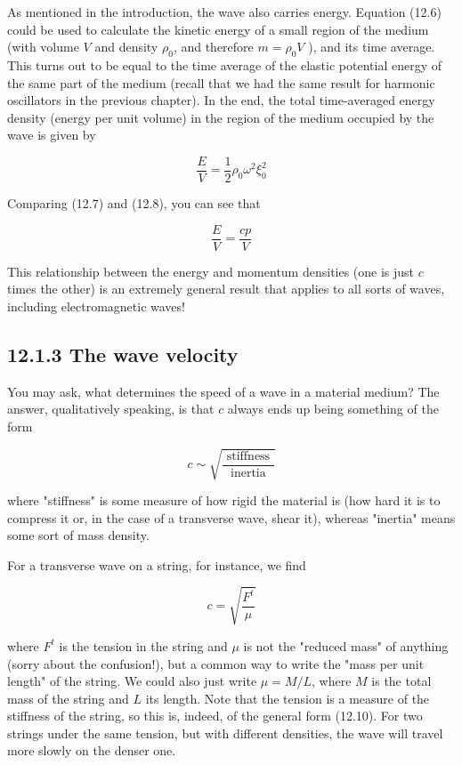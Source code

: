 \documentclass[10pt]{article}
\begin{document}
As mentioned in the introduction, the wave also carries energy. Equation (12.6) could be used to calculate the kinetic energy of a small region of the medium (with volume $V$ and density $\rho_{0}$, and therefore $m=\rho_{0} V$ ), and its time average. This turns out to be equal to the time average of the elastic potential energy of the same part of the medium (recall that we had the same result for harmonic oscillators in the previous chapter). In the end, the total time-averaged energy density (energy per unit volume) in the region of the medium occupied by the wave is given by


\begin{equation*}
\frac{E}{V}=\frac{1}{2} \rho_{0} \omega^{2} \xi_{0}^{2} \tag{12.8}
\end{equation*}


Comparing (12.7) and (12.8), you can see that


\begin{equation*}
\frac{E}{V}=\frac{c p}{V} \tag{12.9}
\end{equation*}


This relationship between the energy and momentum densities (one is just $c$ times the other) is an extremely general result that applies to all sorts of waves, including electromagnetic waves!

\subsection*{12.1.3 The wave velocity}
You may ask, what determines the speed of a wave in a material medium? The answer, qualitatively speaking, is that $c$ always ends up being something of the form


\begin{equation*}
c \sim \sqrt{\frac{\text { stiffness }}{\text { inertia }}} \tag{12.10}
\end{equation*}


where "stiffness" is some measure of how rigid the material is (how hard it is to compress it or, in the case of a transverse wave, shear it), whereas "inertia" means some sort of mass density.

For a transverse wave on a string, for instance, we find


\begin{equation*}
c=\sqrt{\frac{F^{t}}{\mu}} \tag{12.11}
\end{equation*}


where $F^{t}$ is the tension in the string and $\mu$ is not the "reduced mass" of anything (sorry about the confusion!), but a common way to write the "mass per unit length" of the string. We could also just write $\mu=M / L$, where $M$ is the total mass of the string and $L$ its length. Note that the tension is a measure of the stiffness of the string, so this is, indeed, of the general form (12.10). For two strings under the same tension, but with different densities, the wave will travel more slowly on the denser one.
\end{document}
